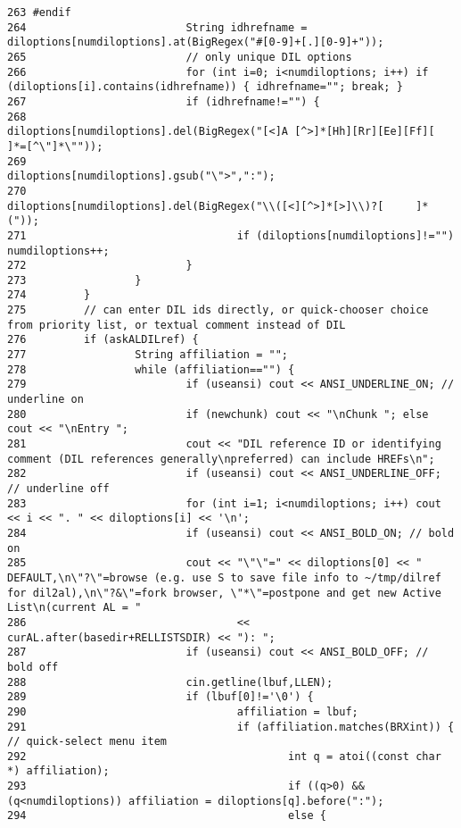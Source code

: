\begin{verbatim}
263 #endif
264                         String idhrefname = diloptions[numdiloptions].at(BigRegex("#[0-9]+[.][0-9]+"));
265                         // only unique DIL options
266                         for (int i=0; i<numdiloptions; i++) if (diloptions[i].contains(idhrefname)) { idhrefname=""; break; }
267                         if (idhrefname!="") {
268                                 diloptions[numdiloptions].del(BigRegex("[<]A [^>]*[Hh][Rr][Ee][Ff][     ]*=[^\"]*\""));
269                                 diloptions[numdiloptions].gsub("\">",":");
270                                 diloptions[numdiloptions].del(BigRegex("\\([<][^>]*[>]\\)?[     ]*("));
271                                 if (diloptions[numdiloptions]!="") numdiloptions++;
272                         }
273                 }
274         }
275         // can enter DIL ids directly, or quick-chooser choice from priority list, or textual comment instead of DIL
276         if (askALDILref) {
277                 String affiliation = "";
278                 while (affiliation=="") {
279                         if (useansi) cout << ANSI_UNDERLINE_ON; // underline on
280                         if (newchunk) cout << "\nChunk "; else cout << "\nEntry ";
281                         cout << "DIL reference ID or identifying comment (DIL references generally\npreferred) can include HREFs\n";
282                         if (useansi) cout << ANSI_UNDERLINE_OFF; // underline off
283                         for (int i=1; i<numdiloptions; i++) cout << i << ". " << diloptions[i] << '\n';
284                         if (useansi) cout << ANSI_BOLD_ON; // bold on
285                         cout << "\"\"=" << diloptions[0] << " DEFAULT,\n\"?\"=browse (e.g. use S to save file info to ~/tmp/dilref for dil2al),\n\"?&\"=fork browser, \"*\"=postpone and get new Active List\n(current AL = "
286                                 << curAL.after(basedir+RELLISTSDIR) << "): ";
287                         if (useansi) cout << ANSI_BOLD_OFF; // bold off
288                         cin.getline(lbuf,LLEN);
289                         if (lbuf[0]!='\0') {
290                                 affiliation = lbuf;
291                                 if (affiliation.matches(BRXint)) { // quick-select menu item
292                                         int q = atoi((const char *) affiliation);
293                                         if ((q>0) && (q<numdiloptions)) affiliation = diloptions[q].before(":");
294                                         else {

\end{verbatim}
